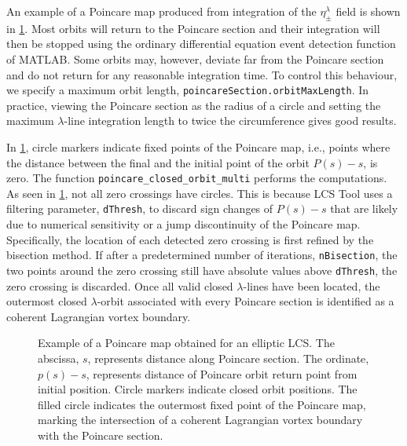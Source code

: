 \documentclass[5p]{elsarticle}
\newlength\figurewidth
\begin{document}
An example of a Poincare map produced from integration of the $\eta_\pm^\lambda$ field is shown in \cref{f:Poincare return map}. Most orbits will return to the Poincare section and their integration will then be stopped using the ordinary differential equation event detection function of MATLAB. Some orbits may, however, deviate far from the Poincare section and do not return for any reasonable integration time. To control this behaviour, we specify a maximum orbit length, \lstinline!poincareSection.orbitMaxLength!. In practice, viewing the Poincare section as the radius of a circle and setting the maximum $\lambda$-line integration length to twice the circumference gives good results.

In \cref{f:Poincare return map}, circle markers indicate fixed points of the Poincare map, i.e., points where the distance between the final and the initial point of the orbit $P(s) - s$, is zero. The function \lstinline!poincare_closed_orbit_multi! performs the computations. As seen in \cref{f:Poincare return map}, not all zero crossings have circles. This is because LCS Tool uses a filtering parameter, \lstinline!dThresh!, to discard sign changes of $P(s) - s$ that are likely due to numerical sensitivity or a jump discontinuity of the Poincare map. Specifically, the location of each detected zero crossing is first refined by the bisection method. If after a predetermined number of iterations, \lstinline!nBisection!, the two points around the zero crossing still have absolute values above \lstinline!dThresh!, the zero crossing is discarded.  Once all valid closed $\lambda$-lines have been located, the outermost closed $\lambda$-orbit associated with every Poincare section is identified as a coherent Lagrangian vortex boundary.

\begin{figure}
\begin{center}
\setlength{}

\end{center}
\caption{Example of a Poincare map obtained for an elliptic LCS. The abscissa, $s$, represents distance along Poincare section. The ordinate, $p(s) - s$, represents distance of Poincare orbit return point from initial position. Circle markers indicate closed orbit positions. The filled circle indicates the outermost fixed point of the Poincare map, marking the intersection of a coherent Lagrangian vortex boundary with the Poincare section.}
\label{f:Poincare return map}
\end{figure}
\end{document}

